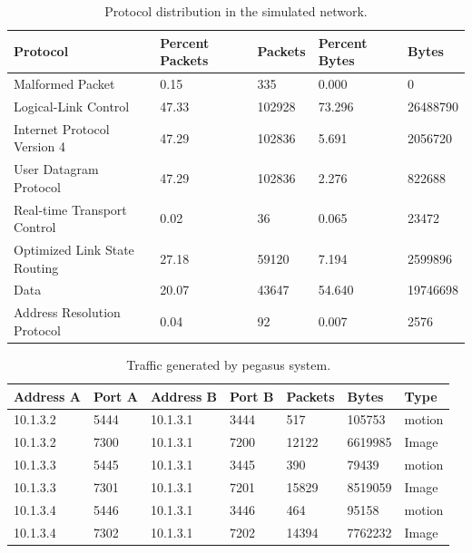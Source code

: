 \begin{table}[t]
	\caption[Protocol distribution in the simulated network.]{\small Protocol distribution in the simulated network.}
	\begin{center}
		\begin{tabular}{lllll}
			\hline Protocol                              & Percent Packets & Packets & Percent Bytes & Bytes    \\ \hline \hline
			Malformed Packet                      & 0.15            & 335     & 0.000         & 0        \\
			Logical-Link Control                  & 47.33           & 102928  & 73.296        & 26488790 \\
			Internet Protocol Version 4           & 47.29           & 102836  & 5.691         & 2056720  \\
			User Datagram Protocol                & 47.29           & 102836  & 2.276         & 822688   \\
			Real-time Transport Control  & 0.02            & 36      & 0.065         & 23472    \\
			Optimized Link State Routing  & 27.18           & 59120   & 7.194         & 2599896  \\
			Data                                  & 20.07           & 43647   & 54.640        & 19746698 \\
			Address Resolution Protocol           & 0.04            & 92      & 0.007         & 2576     \\ \hline
		\end{tabular}
	\end{center}
	\label{tab:packet-protocol}
\end{table}

\begin{table}[t]
	\caption[ Traffic generated by pegasus system.]{\small Traffic generated by pegasus system.}
	\begin{center}
		\begin{tabular}{lllllll}
			\hline Address A & Port A & Address B & Port B & Packets & Bytes   & Type   \\ \hline \hline
			10.1.3.2  & 5444   & 10.1.3.1  & 3444   & 517     & 105753  & motion \\
			10.1.3.2  & 7300   & 10.1.3.1  & 7200   & 12122   & 6619985 & Image  \\
			10.1.3.3  & 5445   & 10.1.3.1  & 3445   & 390     & 79439   & motion \\
			10.1.3.3  & 7301   & 10.1.3.1  & 7201   & 15829   & 8519059 & Image  \\
			10.1.3.4  & 5446   & 10.1.3.1  & 3446   & 464     & 95158   & motion \\
			10.1.3.4  & 7302   & 10.1.3.1  & 7202   & 14394   & 7762232 & Image  \\ \hline
		\end{tabular}
	\end{center}
	\label{tab:traffic-generation}
\end{table}

